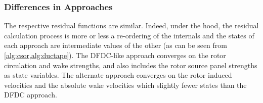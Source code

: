 \subsubsection{Differences in Approaches}


The respective residual functions are similar.
%
Indeed, under the hood, the residual calculation process is more or less a re-ordering of the internals and the states of each approach are intermediate values of the other (as can be seen from \cref{alg:csor,alg:ductape}).
%
%
The DFDC-like approach converges on the rotor circulation and wake strengths, and also includes the rotor source panel strengths as state variables.
%
The alternate approach converges on the rotor induced velocities and the absolute wake velocities which slightly fewer states than the DFDC approach.



%         

